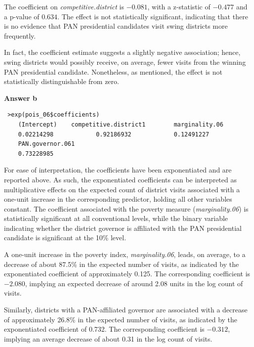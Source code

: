 \documentclass[12pt,letterpaper]{article}
\begin{document}
\vspace{0.5cm}
	
\noindent The coefficient on \emph{competitive.district} is $-0.081$, with a z-statistic of $-0.477$ and a p-value of $0.634$. The effect is not statistically significant, indicating that there is no evidence that PAN presidential candidates visit swing districts more frequently.

\noindent In fact, the coefficient estimate suggests a slightly negative association; hence, swing districts would possibly receive, on average, fewer visits from the winning PAN presidential candidate. Nonetheless, as mentioned, the effect is not statistically distinguishable from zero.

\vspace{0.5cm}
\noindent\textbf{Answer b}\\
\vspace{0.5cm}
\begin{verbatim}
 >exp(pois_06$coefficients)
	(Intercept)    competitive.district1        marginality.06 
	0.02214298            0.92186932            0.12491227 
	PAN.governor.061 
	0.73228985 
\end{verbatim}

\vspace{0.5cm}

\noindent For ease of interpretation, the coefficients have been exponentiated and are reported above. As such, the exponentiated coefficients can be interpreted as multiplicative effects on the expected count of district visits associated with a one-unit increase in the corresponding predictor, holding all other variables constant. The coefficient associated with the poverty measure (\emph{marginality.06}) is statistically significant at all conventional levels, while the binary variable indicating whether the district governor is affiliated with the PAN presidential candidate is significant at the 10\% level.

\vspace{0.5cm}
\noindent A one-unit increase in the poverty index, \emph{marginality.06}, leads, on average, to a decrease of about 87.5\% in the expected number of visits, as indicated by the exponentiated coefficient of approximately 0.125. The corresponding coefficient is $-2.080$, implying an expected decrease of around 2.08 units in the log count of visits.

\noindent Similarly, districts with a PAN-affiliated governor are associated with a decrease of approximately 26.8\% in the expected number of visits, as indicated by the exponentiated coefficient of 0.732. The corresponding coefficient is $-0.312$, implying an average decrease of about 0.31 in the log count of visits.
\end{document}
